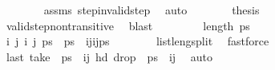 \begin{isabellebody}
\ \ \ \ \ \ \isamarkupfalse%
\ assms\ step{\isacharunderscore}{\kern0pt}in{\isacharunderscore}{\kern0pt}valid{\isacharunderscore}{\kern0pt}step\ \isamarkupfalse%
\ auto\isanewline
\ \ \ \ \isamarkupfalse%
\ \isamarkupfalse%
\ {\isacharquery}{\kern0pt}thesis\isanewline
\ \ \ \ \ \ \isamarkupfalse%
\ valid{\isacharunderscore}{\kern0pt}step{\isacharunderscore}{\kern0pt}non{\isacharunderscore}{\kern0pt}transitive\ \isamarkupfalse%
\ blast\isanewline
\ \ \isamarkupfalse%
\isanewline
\ \ \ \ \isamarkupfalse%
\ {\isachardoublequoteopen}length\ ps\ {\isachargreater}{\kern0pt}\ {}{\isachardoublequoteclose}\isanewline
\ \ \ \ \isamarkupfalse%
\ \isamarkupfalse%
\ i\ j\ i\ j\ ps\ \ {\isachardoublequoteopen}ps\ {\isacharequal}{\kern0pt}\ {\isacharparenleft}{\kern0pt}ijijps\isanewline
\ \ \ \ \ \ \isamarkupfalse%
\ list{\isacharunderscore}{\kern0pt}len{\isacharunderscore}{\kern0pt}g{\isacharunderscore}{\kern0pt}{}{\isacharunderscore}{\kern0pt}split\ \isamarkupfalse%
\ fastforce\isanewline
\ \ \ \ \isamarkupfalse%
\ \isamarkupfalse%
\ {\isachardoublequoteopen}last\ {\isacharparenleft}{\kern0pt}take\ {}\ ps\ {\isacharequal}{\kern0pt}\ {\isacharparenleft}{\kern0pt}ij\ {\isachardoublequoteopen}hd\ {\isacharparenleft}{\kern0pt}drop\ {}\ ps\ {\isacharequal}{\kern0pt}\ {\isacharparenleft}{\kern0pt}ij\ \isamarkupfalse%
\ auto\isanewline

\end{isabellebody}
